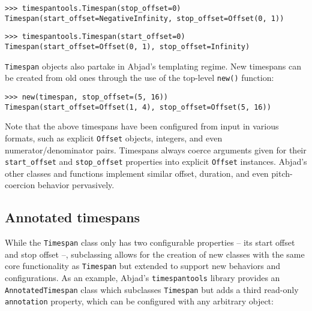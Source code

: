 \begin{singlespacing}
\vspace{-0.5\baselineskip}
\begin{lstlisting}
>>> timespantools.Timespan(stop_offset=0)
Timespan(start_offset=NegativeInfinity, stop_offset=Offset(0, 1))
\end{lstlisting}
\begin{lstlisting}
>>> timespantools.Timespan(start_offset=0)
Timespan(start_offset=Offset(0, 1), stop_offset=Infinity)
\end{lstlisting}
\end{singlespacing}

\noindent \texttt{Timespan} objects also partake in Abjad's templating regime.
New timespans can be created from old ones through the use of the top-level
\texttt{new()} function:

\begin{comment}
<abjad>
new(timespan, stop_offset=(5, 16))
</abjad>
\end{comment}

\begin{singlespacing}
\vspace{-0.5\baselineskip}
\begin{lstlisting}
>>> new(timespan, stop_offset=(5, 16))
Timespan(start_offset=Offset(1, 4), stop_offset=Offset(5, 16))
\end{lstlisting}
\end{singlespacing}

\noindent Note that the above timespans have been configured from input in
various formats, such as explicit \texttt{Offset} objects, integers, and even
numerator/denominator pairs. Timespans always coerce arguments given for their
\texttt{start\_offset} and \texttt{stop\_offset} properties into explicit
\texttt{Offset} instances. Abjad's other classes and functions implement
similar offset, duration, and even pitch-coercion behavior pervasively.

\subsection{Annotated timespans} %

While the \texttt{Timespan} class only has two configurable properties -- its
start offset and stop offset --, subclassing allows for the creation of new
classes with the same core functionality as \texttt{Timespan} but extended to
support new behaviors and configurations. As an example, Abjad's
\texttt{timespantools} library provides an \texttt{AnnotatedTimespan} class
which subclasses \texttt{Timespan} but adds a third read-only
\texttt{annotation} property, which can be configured with any arbitrary
object:

